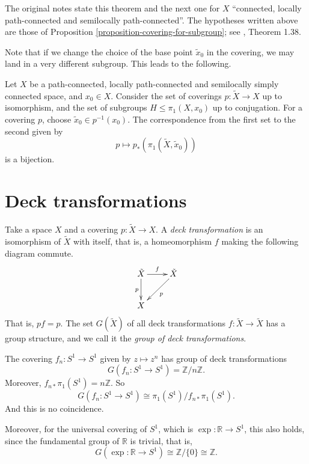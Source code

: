 \begin{remark}
\label{remark-classification-hypotheses}
The original notes state this theorem and
the next one for $X$ ``connected, locally
path-connected and semilocally
path-connected''. The hypotheses written
above are those of
Proposition
\ref{proposition-covering-for-subgroup}; see
\cite{hat}, Theorem 1.38.
\end{remark}

Note that if we change the choice of the
base point $\tilde{x}_0$ in the covering,
we may land in a very different subgroup.
This leads to the following.

\begin{theorem}
\label{theorem-classification-coverings}
Let $X$ be a path-connected, locally
path-connected and semilocally simply
connected space, and $x_0\in X$. Consider
the set of coverings $p:\tilde{X}\to X$ up
to isomorphism, and the set of subgroups
$H\leq\pi_1(X,x_0)$ up to conjugation. For a
covering $p$, choose
$\tilde{x}_0\in p^{-1}(x_0)$. The
correspondence from the first set to the
second given by
$$
p\longmapsto
p_*\left(\pi_1(\tilde{X},\tilde{x}_0)
\right)
$$
is a bijection.
\end{theorem}

\section{Deck transformations}
\label{section-deck-transformations}

\begin{definition}
\label{definition-deck-transformation}
Take a space $X$ and a covering
$p:\tilde{X}\to X$. A
{\it deck transformation} is an isomorphism
of $\tilde{X}$ with itself, that is, a
homeomorphism $f$ making the following
diagram commute.
$$
\xymatrix{
\tilde{X} \ar[r]^{f} \ar[d]_{p}
  & \tilde{X} \ar[dl]^{p} \\
X
}
$$
That is, $pf=p$. The set $G(\tilde{X})$ of
all deck transformations
$f:\tilde{X}\to\tilde{X}$ has a group
structure, and we call it the
{\it group of deck transformations}.
\end{definition}

\begin{example}
\label{example-deck-transformations-circle}
The covering $f_n:S^1\to S^1$ given by
$z\mapsto z^n$ has group of deck
transformations
$$
G(f_n:S^1\to S^1)=\mathbb{Z}/n\mathbb{Z}.
$$
Moreover, $f_{n*}\pi_1(S^1)=n\mathbb{Z}$.
So
$$
G(f_n:S^1\to S^1)\cong
\pi_1(S^1)/f_{n*}\pi_1(S^1).
$$
And this is no coincidence.

Moreover, for the universal covering of
$S^1$, which is $\exp:\mathbb{R}\to S^1$,
this also holds, since the fundamental group
of $\mathbb{R}$ is trivial, that is,
$$
G(\exp:\mathbb{R}\to S^1)
\cong\mathbb{Z}/\{0\}\cong\mathbb{Z}.
$$
\end{example}

